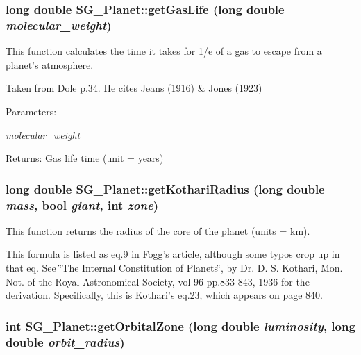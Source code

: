 \subsubsection{\setlength{\rightskip}{0pt plus 5cm}long double SG\_\-Planet::get\-Gas\-Life (long double {\em molecular\_\-weight})\hspace{0.3cm}{\tt  [protected]}}\label{class_s_g___planet_b30}


This function calculates the time it takes for 1/e of a gas to escape from a planet's atmosphere. 

Taken from Dole p.34. He cites Jeans (1916) \& Jones (1923) \begin{Desc}
\item[Parameters:]
\begin{description}
\item[{\em molecular\_\-weight}]\end{description}
\end{Desc}
\begin{Desc}
\item[Returns:]Gas life time (unit = years) \end{Desc}
\subsubsection{\setlength{\rightskip}{0pt plus 5cm}long double SG\_\-Planet::get\-Kothari\-Radius (long double {\em mass}, bool {\em giant}, int {\em zone})\hspace{0.3cm}{\tt  [protected]}}\label{class_s_g___planet_b10}


This function returns the radius of the core of the planet (units = km). 

This formula is listed as eq.9 in Fogg's article, although some typos crop up in that eq. See \char`\"{}The Internal Constitution of Planets\char`\"{}, by Dr. D. S. Kothari, Mon. Not. of the Royal Astronomical Society, vol 96 pp.833-843, 1936 for the derivation. Specifically, this is Kothari's eq.23, which appears on page 840. 
\subsubsection{\setlength{\rightskip}{0pt plus 5cm}int SG\_\-Planet::get\-Orbital\-Zone (long double {\em luminosity}, long double {\em orbit\_\-radius})\hspace{0.3cm}{\tt  [protected]}}\label{class_s_g___planet_b11}


